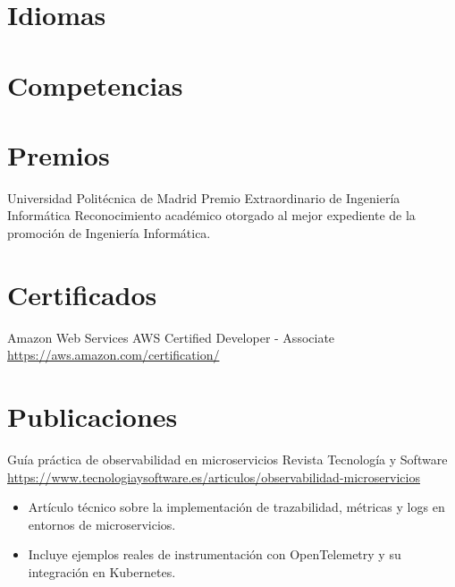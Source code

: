 \documentclass[a4paper, serif, 10pt]{moderncv}
\begin{document}
\section{Idiomas}

\section{Competencias}

\section{Premios}

        {Universidad Politécnica de Madrid}
        {Premio Extraordinario de Ingeniería Informática}
        {}
        {}
        {Reconocimiento académico otorgado al mejor expediente de la promoción de Ingeniería Informática.}
\section{Certificados}

        {Amazon Web Services}
        {AWS Certified Developer - Associate}
        {\url{https://aws.amazon.com/certification/}}
        {}
        {}
\section{Publicaciones}

        {Guía práctica de observabilidad en microservicios}
        {Revista Tecnología y Software}
        {\url{https://www.tecnologiaysoftware.es/articulos/observabilidad-microservicios}}
        {}
        {\begin{itemize}
\item Artículo técnico sobre la implementación de trazabilidad, métricas y logs en entornos de microservicios.
\item Incluye ejemplos reales de instrumentación con OpenTelemetry y su integración en Kubernetes.
\end{itemize}}
\end{document}
